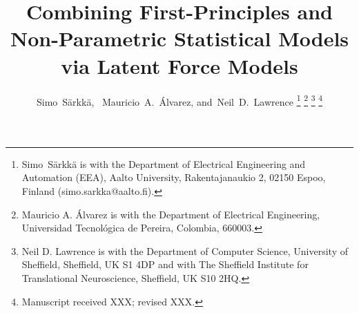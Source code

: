 \documentclass[journal]{IEEEtran}
\begin{document}
%
\title{Combining First-Principles and Non-Parametric Statistical Models via Latent Force Models}


%
%
%

\author{Simo~S\"arkk\"a,~
        Mauricio~A.~\'Alvarez, 
        and~Neil~D.~Lawrence%
\thanks{Simo~S\"arkk\"a is with the Department of Electrical Engineering and Automation (EEA), Aalto University, Rakentajanaukio 2, 02150 Espoo, Finland (simo.sarkka@aalto.fi).}%
\thanks{Mauricio A. \'Alvarez is with the Department of Electrical Engineering,
Universidad Tecnol\'ogica de Pereira, Colombia, 660003.}%
\thanks{Neil D. Lawrence is with the Department of Computer Science, University of Sheffield,
Sheffield, UK S1 4DP and with The Sheffield Institute for Translational Neuroscience,
Sheffield, UK S10 2HQ.}%
\thanks{Manuscript received XXX; revised XXX.}}


%
%
\end{document}
